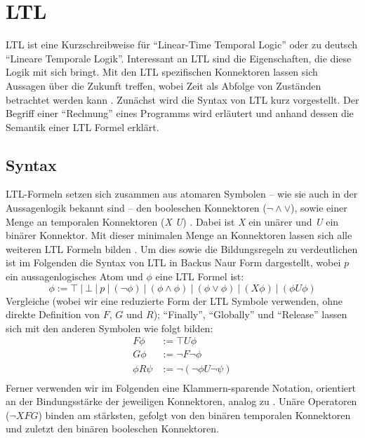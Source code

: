 \section{LTL}

LTL ist eine Kurzschreibweise für "`Linear-Time Temporal Logic"' oder zu deutsch "`Lineare Temporale Logik"'. Interessant an LTL sind die Eigenschaften, die diese Logik mit sich bringt. Mit den LTL spezifischen Konnektoren lassen sich Aussagen über die Zukunft treffen, wobei Zeit als Abfolge von Zuständen betrachtet werden kann \cite{huth+04}. Zunächst wird die Syntax von LTL kurz vorgestellt. Der Begriff einer "`Rechnung"' eines Programms wird erläutert und anhand dessen die Semantik einer LTL Formel erklärt.

\subsection{Syntax}

LTL-Formeln setzen sich zusammen aus atomaren Symbolen -- wie sie auch in der Aussagenlogik bekannt sind -- den booleschen Konnektoren ($\lnot \land \lor$), sowie einer Menge an temporalen Konnektoren (\textit{X U}) \cite{huth+04,vardi+96}. Dabei ist \textit{X} ein unärer und \textit{U} ein binärer Konnektor. Mit dieser minimalen Menge an Konnektoren lassen sich alle weiteren LTL Formeln bilden \cite{vardi+96}.
Um dies sowie die Bildungsregeln zu verdeutlichen ist im Folgenden die Syntax von LTL in Backus Naur Form dargestellt, wobei $p$ ein aussagenlogisches Atom und $\phi$ eine LTL Formel ist:
\begin{equation}
\label{ltl:syntax_basics}
    \phi := \top\ |\ \bot\ |\ p\ |\ (\lnot\phi)\ |\ (\phi \land \phi)\ |\ (\phi \lor \phi)\ |\ (X\phi)\ |\ (\phi U\phi)
\end{equation}
Vergleiche \cite{huth+04} (wobei wir eine reduzierte Form der LTL Symbole verwenden, ohne direkte Definition von $F$, $G$ und $R$); "`Finally"', "`Globally"' und "`Release"' lassen sich mit den anderen Symbolen wie folgt bilden:
\begin{equation}
\label{ltl:syntax_details}
\begin{split}
    F\phi &:= \top U\phi\\
    G\phi &:= \lnot F\lnot\phi\\
    \phi R\psi &:= \lnot(\lnot\phi U\lnot\psi)\\
\end{split}
\end{equation}
Ferner verwenden wir im Folgenden eine Klammern-sparende Notation, orientiert an der Bindungsstärke der jeweiligen Konnektoren, analog zu \cite{huth+04}. Unäre Operatoren ($\lnot X F G$) binden am stärksten, gefolgt von den binären temporalen Konnektoren und zuletzt den binären booleschen Konnektoren.


